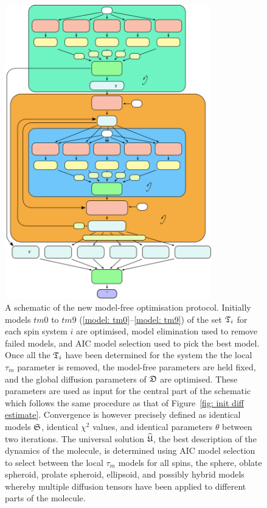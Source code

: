 \begin{htmlonly}
\begin{htmlonly}
\begin{figure}
\centerline{\includegraphics[width=0.8\textwidth, bb=0 0 461 697]{images/model_free/new_protocol}}
\caption[A schematic of the new model-free optimisation protocol]{A schematic of the new model-free optimisation protocol.  Initially models $tm0$ to $tm9$ (\ref{model: tm0}--\ref{model: tm9}) of the set $\mathfrak{T}_i$ for each spin system $i$ are optimised, model elimination used to remove failed models, and AIC model selection used to pick the best model.  Once all the $\mathfrak{T}_i$ have been determined for the system the the local $\tau_m$ parameter is removed, the model-free parameters are held fixed, and the global diffusion parameters of $\mathfrak{D}$ are optimised.  These parameters are used as input for the central part of the schematic which follows the same procedure as that of Figure~\ref{fig: init diff estimate}.  Convergence is however precisely defined as identical models $\mathfrak{S}$, identical $\chi^2$ values, and identical parameters $\theta$ between two iterations.  The universal solution $\widehat{\mathfrak{U}}$, the best description of the dynamics of the molecule, is determined using AIC model selection to select between the local $\tau_m$ models for all spins, the sphere, oblate spheroid, prolate spheroid, ellipsoid, and possibly hybrid models whereby multiple diffusion tensors have been applied to different parts of the molecule.} \label{fig: new protocol}
\end{figure}



\end{htmlonly}
\end{htmlonly}
